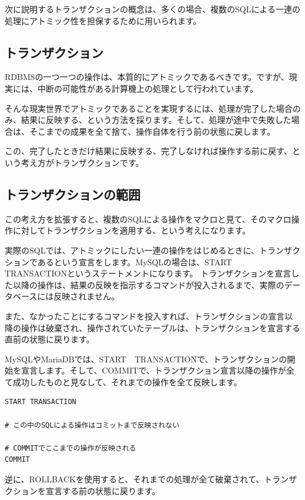 次に説明するトランザクションの概念は、多くの場合、複数のSQLによる一連の処理にアトミック性を担保するために用いられます。

\subsection{トランザクション}

RDBMSの一つ一つの操作は、本質的にアトミックであるべきです。ですが、現実には、中断の可能性がある計算機上の処理として行われています。

そんな現実世界でアトミックであることを実現するには、処理が完了した場合のみ、結果に反映する、という方法を採ります。そして、処理が途中で失敗した場合は、そこまでの成果を全て捨て、操作自体を行う前の状態に戻します。

この、完了したときだけ結果に反映する、完了しなければ操作する前に戻す、という考え方がトランザクションです。

\subsection{トランザクションの範囲}

この考え方を拡張すると、複数のSQLによる操作をマクロと見て、そのマクロ操作に対してトランザクションを適用する、という考えになります。

実際のSQLでは、アトミックにしたい一連の操作をはじめるときに、トランザクションであるという宣言をします。MySQLの場合は、START　TRANSACTIONというステートメントになります。
トランザクションを宣言した以降の操作は、結果の反映を指示するコマンドが投入されるまで、実際のデータベースには反映されません。

また、なかったことにするコマンドを投入すれば、トランザクションの宣言以降の操作は破棄され、操作されていたテーブルは、トランザクションを宣言する直前の状態に戻ります。

MySQLやMariaDBでは、START　TRANSACTIONで、トランザクションの開始を宣言します。そして、COMMITで、トランザクション宣言以降の操作が全て成功したものと見なして、それまでの操作を全て反映します。

\begin{lstlisting}[caption=コミットで完結するトランザクション,label=sql:commit]
START TRANSACTION

# この中のSQLによる操作はコミットまで反映されない

# COMMITでここまでの操作が反映される
COMMIT
\end{lstlisting}

逆に、ROLLBACKを使用すると、それまでの処理が全て破棄されて、トランザクションを宣言する前の状態に戻ります。


